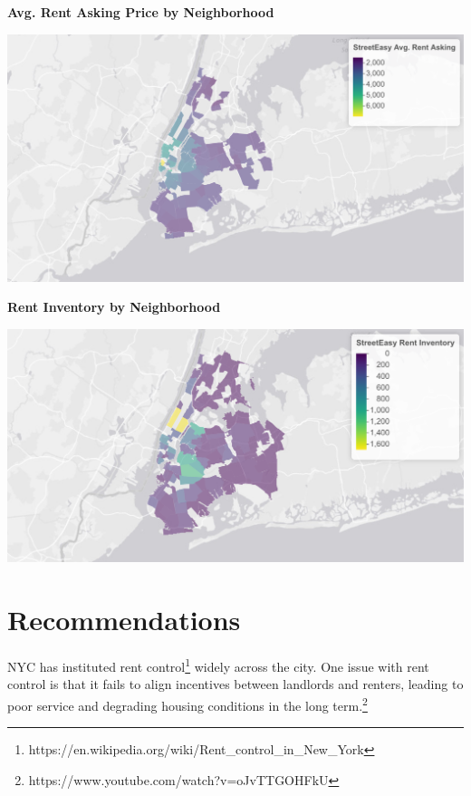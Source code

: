 \documentclass[12pt]{article}
\begin{document}
\newpage

\begin{center}
  \textbf{Avg. Rent Asking Price by Neighborhood}

  \includegraphics[width=6.5in]{./rent-asking.png}
\end{center}

\begin{center}
  \textbf{Rent Inventory by Neighborhood}

  \includegraphics[width=6.5in]{./rent-inventory.png}
\end{center}

\newpage

\section{Recommendations}

NYC has instituted rent control\footnote{https://en.wikipedia.org/wiki/Rent\_control\_in\_New\_York} widely across the city. One issue with rent control is that it fails to align incentives between landlords and renters, leading to poor service and degrading housing conditions in the long term.\footnote{https://www.youtube.com/watch?v=oJvTTGOHFkU}
\end{document}
